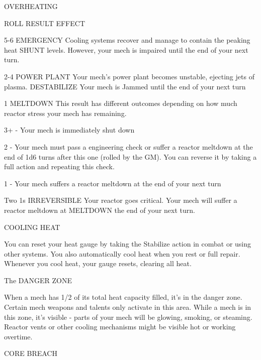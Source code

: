                                                 OVERHEATING


 ROLL       RESULT                  EFFECT

 5-6        EMERGENCY               Cooling systems recover and manage to contain the peaking heat
            SHUNT                   levels. However, your mech is impaired until the end of your next turn.

 2-4        POWER PLANT             Your mech’s power plant becomes unstable, ejecting jets of plasma.
            DESTABILIZE             Your mech is Jammed until the end of your next turn

 1          MELTDOWN                This result has different outcomes depending on how much reactor
                                    stress your mech has remaining.

                                    3+ - Your mech is immediately shut down

                                    2 - Your mech must pass a engineering check or suffer a reactor
                                    meltdown at the end of 1d6 turns after this one (rolled by the GM). You
                                    can reverse it by taking a full action and repeating this check.

                                    1 - Your mech suffers a reactor meltdown at the end of your next turn

 Two 1s     IRREVERSIBLE            Your reactor goes critical. Your mech will suffer a reactor meltdown at
            MELTDOWN                the end of your next turn.

                                               COOLING HEAT




You can reset your heat gauge by taking the Stabilize action in combat or using other systems.
You also automatically cool heat when you rest or full repair. Whenever you cool heat, your gauge
resets, clearing all heat.


                                            The DANGER ZONE

When a mech has 1/2 of its total heat capacity filled, it’s in the danger zone. Certain mech
weapons and talents only activate in this area. While a mech is in this zone, it’s visible - parts of
your mech will be glowing, smoking, or steaming. Reactor vents or other cooling mechanisms
might be visible hot or working overtime.


                                              CORE BREACH

